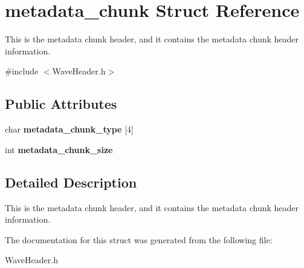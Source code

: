 \hypertarget{structmetadata__chunk}{}\section{metadata\+\_\+chunk Struct Reference}
\label{structmetadata__chunk}


This is the metadata chunk header, and it contains the metadata chunk header information.  




{\ttfamily \#include $<$Wave\+Header.\+h$>$}

\subsection*{Public Attributes}
\begin{DoxyCompactItemize}
\item 
\mbox{\label{structmetadata__chunk_a745472e568604b58fbebfbf8260a1e43}} 
char {\bfseries metadata\+\_\+chunk\+\_\+type} \mbox{[}4\mbox{]}
\item 
\mbox{\label{structmetadata__chunk_a9c643ddf4c65b6f2559f0aa7e1059fa5}} 
int {\bfseries metadata\+\_\+chunk\+\_\+size}
\end{DoxyCompactItemize}


\subsection{Detailed Description}
This is the metadata chunk header, and it contains the metadata chunk header information. 

The documentation for this struct was generated from the following file\+:\begin{DoxyCompactItemize}
\item 
Wave\+Header.\+h\end{DoxyCompactItemize}
